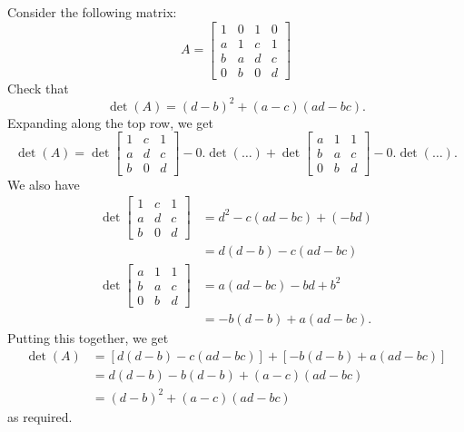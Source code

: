 \documentclass[a4paper]{book}
\newcommand{\bbm}       {\begin{bmatrix}}
\newcommand{\ebm}       {\end{bmatrix}}
\renewcommand{\:}{\colon}
\theoremstyle{definition}
\newenvironment{starex}{
 \renewcommand{\thetheorem}{\arabic{chapter}.\arabic{section}.\arabic{theorem}${}^*$}
 \exercise
}{\endexercise}
\renewenvironment{solution}{\SolutionInline}{\endSolutionInline}
\begin{document}
\begin{starex}
 Consider the following matrix:
 \[ A = \bbm
          1 & 0 & 1 & 0 \\
          a & 1 & c & 1 \\
          b & a & d & c \\
          0 & b & 0 & d
        \ebm
 \]
 Check that
 \[ \det(A) = (d-b)^2 + (a-c)(ad - bc). \]
\end{starex}
\begin{solution}
 Expanding along the top row, we get
 \[ \det(A) =
     \det\bbm 1&c&1 \\ a&d&c \\ b&0&d \ebm
   - 0.\det(\ldots)
   + \det\bbm a&1&1 \\ b&a&c \\ 0&b&d \ebm
   - 0.\det(\ldots).
 \]
 We also have
 \begin{align*}
  \det\bbm 1&c&1 \\ a&d&c \\ b&0&d \ebm
   &= d^2 -c(ad-bc) + (-bd) \\
   &= d(d-b) - c(ad-bc) \\
  \det\bbm a&1&1 \\ b&a&c \\ 0&b&d \ebm
   &= a(ad-bc) - bd + b^2 \\
   &= -b(d-b) + a(ad-bc).
 \end{align*}
 Putting this together, we get
 \begin{align*}
  \det(A) &= [d(d-b) - c(ad-bc)] + [-b(d-b) + a(ad-bc)] \\
          &= d(d-b) - b(d-b) + (a-c)(ad-bc) \\
          &= (d-b)^2 + (a-c)(ad-bc)
 \end{align*}
 as required.
\end{solution}
\end{document}
